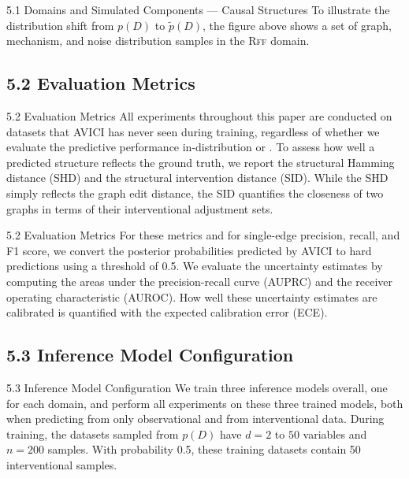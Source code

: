 \documentclass[aspectratio=169,10pt]{beamer}
\newcommand{\domain}[1]{\textsc{#1}}
\newcommand{\rffdomain}{\domain{Rff}\xspace}
\newcommand{\ood}{\text{o.o.d.}\xspace}
\newcommand{\ours}{AVICI\xspace}
\begin{document}
\begin{frame}{5.1 Domains and Simulated Components --- Causal Structures}
To illustrate the distribution shift from $p(D)$ to $\tilde{p}(D)$, the figure above shows a set of graph, mechanism, and noise distribution samples in the \rffdomain domain.
\end{frame}

\subsection{5.2 Evaluation Metrics}

\begin{frame}{5.2 Evaluation Metrics}
All experiments throughout this paper are conducted on datasets that \ours has never seen during training, regardless of whether we evaluate the predictive performance in-distribution or \ood. To assess how well a predicted structure reflects the ground truth, we report the structural Hamming distance (SHD) and the structural intervention distance (SID). While the SHD simply reflects the graph edit distance, the SID quantifies the closeness of two graphs in terms of their interventional adjustment sets.
\end{frame}

\begin{frame}{5.2 Evaluation Metrics}
For these metrics and for single-edge precision, recall, and F1 score, we convert the posterior probabilities predicted by \ours to hard predictions using a threshold of \num{0.5}. We evaluate the uncertainty estimates by computing the areas under the precision-recall curve (AUPRC) and the receiver operating characteristic (AUROC). How well these uncertainty estimates are calibrated is quantified with the expected calibration error (ECE).
\end{frame}

\subsection{5.3 Inference Model Configuration}

\begin{frame}{5.3 Inference Model Configuration}
We train three inference models overall, one for each domain, and perform all experiments on these three trained models, both when predicting from only observational and from interventional data. During training, the datasets sampled from $p(D)$ have $d=2$ to $50$ variables and $n=200$ samples. With probability 0.5, these training datasets contain \num{50} interventional samples.
\end{frame}
\end{document}
